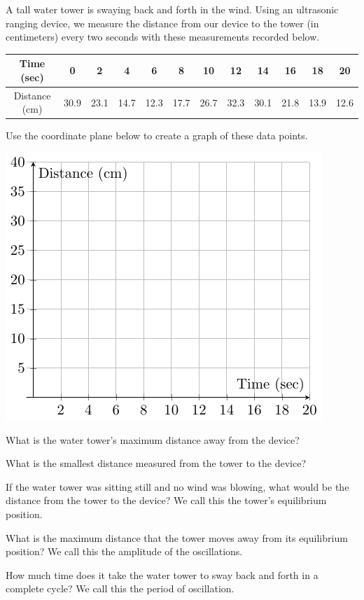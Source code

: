 \begin{pa} \label{PA:0.5}
A tall water tower is swaying back and forth in the wind.  Using an ultrasonic ranging
device, we measure the distance from our device to the tower (in centimeters) every two
seconds with these measurements recorded below.  

\medskip

\begin{tabular}{| c | c | c | c | c | c | c | c | c | c | c | c |}
\hline
Time (sec) & 0 & 2 & 4 & 6 & 8 & 10 & 12 & 14 & 16 & 18 & 20 \\
\hline
Distance (cm) & 30.9 & 23.1 & 14.7 & 12.3 & 17.7 & 26.7 & 32.3 & 30.1 & 21.8 & 13.9 & 12.6 \\
\hline
\end{tabular}

\ba
\item Use the coordinate plane below to create a graph of these data points.
    \begin{center}
        \includegraphics[width=0.5\columnwidth]{figures/0-5-fig1.pdf}
    \end{center}
\item What is the water tower's maximum distance away from the device? %
\item What is the smallest distance measured from the tower to the device? %
\item If the water tower was sitting still and no wind was blowing, what would be the distance from the tower to the device?  We call this the tower's equilibrium position.%
\item What is the maximum distance that the tower moves away from its equilibrium position?  We call this the amplitude of the oscillations.  %
\item How much time does it take the water tower to sway back and forth in a complete cycle?  We call this the period of oscillation.  %



\ea
\end{pa} \afterpa
